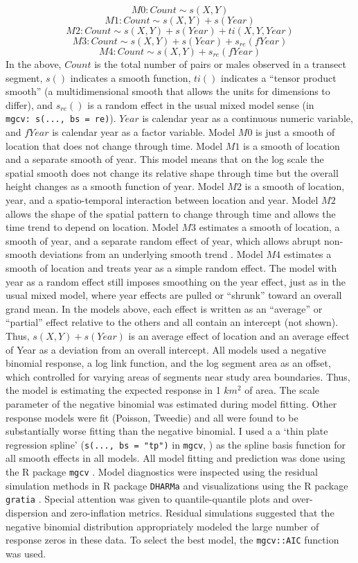 \documentclass[
  10pt,
  letterpaper,
]{article}
\begin{document}
\[M0: Count \sim s(X, Y)\] \[M1: Count \sim s(X, Y) + s(Year)\]
\[M2: Count \sim s(X, Y) + s(Year) + ti(X, Y, Year)\]
\[M3: Count \sim s(X, Y) + s(Year) + s_{re}(fYear)\]
\[M4: Count \sim s(X, Y) + s_{re}(fYear)\] In the above, \(Count\) is
the total number of pairs or males observed in a transect segment,
\(s()\) indicates a smooth function, \(ti()\) indicates a ``tensor
product smooth'' (a multidimensional smooth that allows the units for
dimensions to differ), and \(s_{re}()\) is a random effect in the usual
mixed model sense (in
\texttt{mgcv:\ s(...,\ bs\ =\ \textquotesingle{}re\textquotesingle{})}).
\(Year\) is calendar year as a continuous numeric variable, and
\(fYear\) is calendar year as a factor variable. Model \(M0\) is just a
smooth of location that does not change through time. Model \(M1\) is a
smooth of location and a separate smooth of year. This model means that
on the log scale the spatial smooth does not change its relative shape
through time but the overall height changes as a smooth function of
year. Model \(M2\) is a smooth of location, year, and a spatio-temporal
interaction between location and year. Model \(M2\) allows the shape of
the spatial pattern to change through time and allows the time trend to
depend on location. Model \(M3\) estimates a smooth of location, a
smooth of year, and a separate random effect of year, which allows
abrupt non-smooth deviations from an underlying smooth trend
\citep{smith2021north}. Model \(M4\) estimates a smooth of location and
treats year as a simple random effect. The model with year as a random
effect still imposes smoothing on the year effect, just as in the usual
mixed model, where year effects are pulled or ``shrunk'' toward an
overall grand mean. In the models above, each effect is written as an
``average'' or ``partial'' effect relative to the others and all contain
an intercept (not shown). Thus, \(s(X,Y) + s(Year)\) is an average
effect of location and an average effect of Year as a deviation from an
overall intercept. All models used a negative binomial response, a log
link function, and the log segment area as an offset, which controlled
for varying areas of segments near study area boundaries. Thus, the
model is estimating the expected response in 1 \(km^2\) of area. The
scale parameter of the negative binomial was estimated during model
fitting. Other response models were fit (Poisson, Tweedie) and all were
found to be substantially worse fitting than the negative binomial. I
used a a `thin plate regression spline' (\texttt{s(...,\ bs\ =\ "tp")}
in \texttt{mgcv}, \citep{r-mgcv}) as the spline basis function for all
smooth effects in all models. All model fitting and prediction was done
using the R package \texttt{mgcv} \citep{r-mgcv}. Model diagnostics were
inspected using the residual simulation methods in R package
\texttt{DHARMa} \citep{DHARMa} and visualizations using the R package
\texttt{gratia} \citep{r-gratia}. Special attention was given to
quantile-quantile plots and over-dispersion and zero-inflation metrics.
Residual simulations suggested that the negative binomial distribution
appropriately modeled the large number of response zeros in these data.
To select the best model, the \texttt{mgcv::AIC} function was used.
\end{document}
